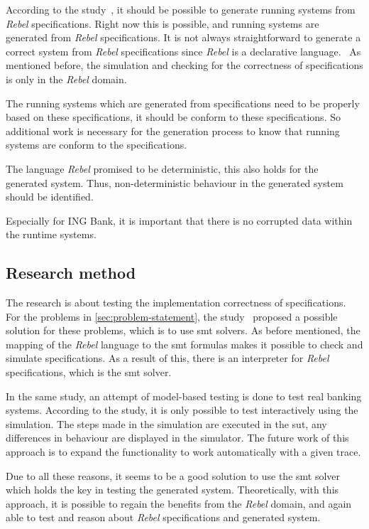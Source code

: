 According to the study~\cite[p.~3]{stoel2015case}, it should be possible to generate
running systems from \textit{Rebel} specifications. Right now this is possible, and
running systems are generated from \textit{Rebel} specifications. It is not always straightforward to generate a correct system from \textit{Rebel}
specifications since \textit{Rebel} is a declarative language.~\cite[p.~3]{stoel2015case}
As mentioned before, the simulation and checking for the correctness of
specifications is only in the \textit{Rebel} domain.

The running systems which are
generated from specifications need to be properly based on these specifications,
it should be conform to these specifications. So additional work is necessary for
the generation process to know that running systems are conform to the
specifications.

The language \textit{Rebel} promised to be deterministic, this also holds
for the generated system. Thus, non-deterministic behaviour in the generated
system should be identified.

Especially for ING Bank, it is important that there is no corrupted data within
the runtime systems.


\subsection{Research method}\label{sec:research-method}

The research is about testing the implementation correctness of specifications.
For the problems in \autoref{sec:problem-statement}, the
study~\cite[p.3]{stoel2015case} proposed a possible solution for these problems,
which is to use \gls{smt} solvers. As before mentioned, the mapping of the \textit{Rebel}
language to the \gls{smt} formulas makes it possible to check and simulate
specifications. As a result of this, there is an interpreter for \textit{Rebel}
specifications, which is the \gls{smt}
solver.~\cite[p.5]{stoel_storm_vinju_bosman_2016}

In the same study,
an attempt of model-based testing is done to test real banking systems.
According to the study, it is only possible to test interactively using the
simulation. The steps made in the simulation are executed in the \gls{sut}, any
differences in behaviour are displayed in the simulator. The future work of this
approach is to expand the functionality to work automatically with a given
trace.

Due to all these reasons, it seems to be a good solution to use the \gls{smt}
solver which holds the key in testing the generated system. Theoretically, with
this approach, it is possible to regain the benefits from the \textit{Rebel} domain, and
again able to test and reason about \textit{Rebel} specifications and generated system.

